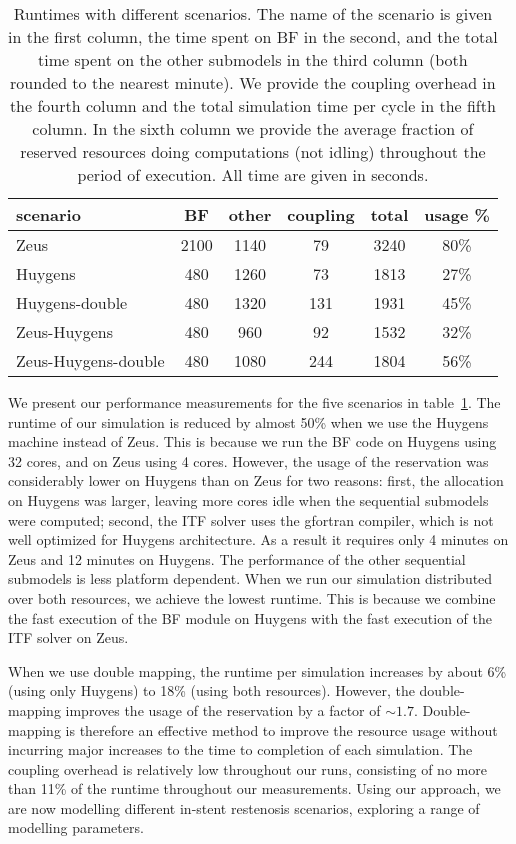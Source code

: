 \documentclass[a4,10pt]{article}
\begin{document}
\begin{table}
    \centering
\begin{tabular}{lccccc}
scenario & BF & other & coupling & total & usage \%\\
\hline
Zeus                & 2100 & 1140 & 79  & 3240 & 80\% \\
Huygens             & 480  & 1260 & 73  & 1813 & 27\% \\
Huygens-double      & 480  & 1320 & 131 & 1931 & 45\% \\
Zeus-Huygens        & 480  & 960  & 92  & 1532 & 32\% \\
Zeus-Huygens-double & 480  & 1080 & 244 & 1804 & 56\% \\
\end{tabular}

    \caption{Runtimes with different scenarios. The name of the scenario is
given in the first column, the time spent on BF in the second, and the total
time spent on the other submodels in the third column (both rounded to the
nearest minute). We provide the coupling overhead in the fourth column and the
total simulation time per cycle in the fifth column. In the sixth column we
provide the average fraction of reserved resources doing computations (not idling)
throughout the period of execution. All time are given in seconds.}\label{table:isrruntime}

\end{table}

We present our performance measurements for the five scenarios in
table~\ref{table:isrruntime}. The runtime of our simulation is reduced by almost
50\% when we use the Huygens machine instead of Zeus. This is because we run the
BF code on Huygens using 32 cores, and on Zeus using 4 cores. However, the
usage of the reservation was considerably lower on Huygens than on Zeus for two
reasons: first, the allocation on Huygens was larger, leaving more cores idle
when the sequential submodels were computed; second, the ITF solver uses the
gfortran compiler, which is not well optimized for Huygens architecture. As a
result it requires only 4 minutes on Zeus and 12 minutes on Huygens. The
performance of the other sequential submodels is less platform dependent. When
we run our simulation distributed over both resources, we achieve the lowest
runtime. This is because we combine the fast execution of the BF module on
Huygens with the fast execution of the ITF solver on Zeus.  

When we use double mapping, the runtime per simulation increases by about 6\%
(using only Huygens) to 18\% (using both resources). However, the
double-mapping improves the usage of the reservation by a factor of $\sim1.7$.
Double-mapping is therefore an effective method to improve the resource usage
without incurring major increases to the time to completion of each simulation.
The coupling overhead is relatively low throughout our runs, consisting
of no more than 11\% of the runtime throughout our measurements. Using our 
approach, we are now modelling different in-stent restenosis scenarios, 
exploring a range of modelling parameters. 
\end{document}
